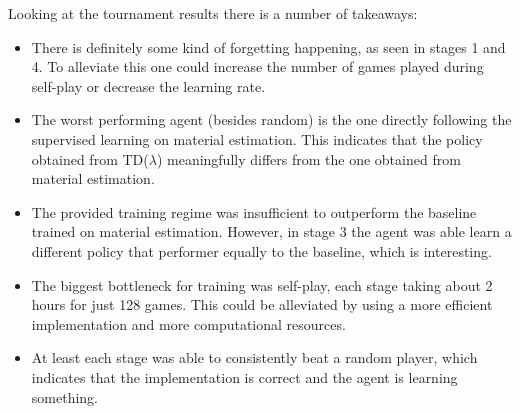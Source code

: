 \documentclass[a4paper,12pt]{article}
\theoremstyle{definition}
\theoremstyle{definition}
\theoremstyle{definition}
\theoremstyle{definition}
\theoremstyle{definition}
\theoremstyle{definition}
\begin{document}
	Looking at the tournament results there is a number of takeaways:
	\begin{itemize}
		\item There is definitely some kind of forgetting happening, as seen in stages 1 and 4. To alleviate this one could increase the number of games played during self-play or decrease the learning rate.
		\item The worst performing agent (besides random) is the one directly following the supervised learning on material estimation. This indicates that the policy obtained from TD($\lambda$) meaningfully differs from the one obtained from material estimation.
		\item The provided training regime was insufficient to outperform the baseline trained on material estimation. However, in stage 3 the agent was able learn a different policy that performer equally to the baseline, which is interesting.
		\item The biggest bottleneck for training was self-play, each stage taking about 2 hours for just 128 games. This could be alleviated by using a more efficient implementation and more computational resources.
		\item At least each stage was able to consistently beat a random player, which indicates that the implementation is correct and the agent is learning something.
	\end{itemize}
	
	
	
	
	
\end{document}
